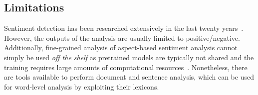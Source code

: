 \subsection{\statusgreen Limitations}

Sentiment detection has been researched extensively in the last twenty years~\citep{medhat2014sentiment}.
However, the outputs of the analysis are usually limited to positive/negative.
Additionally, fine-grained analysis of aspect-based sentiment analysis cannot simply be used \emph{off the shelf} as pretrained models are typically not shared and the training requires large amounts of computational resources~\cite{brauwers2022survey}.
Nonetheless, there are tools available to perform document and sentence analysis, which can be used for word-level analysis by exploiting their lexicons.

